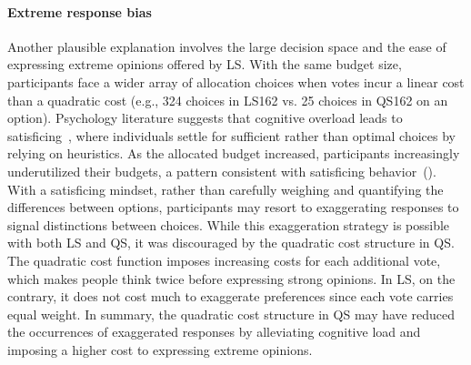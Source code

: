 \paragraph{Extreme response bias}
Another plausible explanation involves the large decision space and the ease of expressing extreme opinions offered by LS. With the same budget size, participants face a wider array of allocation choices when votes incur a linear cost than a quadratic cost (e.g., 324 choices in LS162 vs. 25 choices in QS162 on an option). Psychology literature suggests that cognitive overload leads to satisficing~\cite{schwartzMaximizingSatisficingHappiness2002, iyengarWhenChoiceDemotivating2000}, where individuals settle for sufficient rather than optimal choices by relying on heuristics. As the allocated budget increased, participants increasingly underutilized their budgets, a pattern consistent with satisficing behavior~(). With a satisficing mindset, rather than carefully weighing and quantifying the differences between options, participants may resort to exaggerating responses to signal distinctions between choices. While this exaggeration strategy is possible with both LS and QS, it was discouraged by the quadratic cost structure in QS. The quadratic cost function imposes increasing costs for each additional vote, which makes people think twice before expressing strong opinions. In LS, on the contrary, it does not cost much to exaggerate preferences since each vote carries equal weight. In summary, the quadratic cost structure in QS may have reduced the occurrences of exaggerated responses by alleviating cognitive load and imposing a higher cost to expressing extreme opinions.

